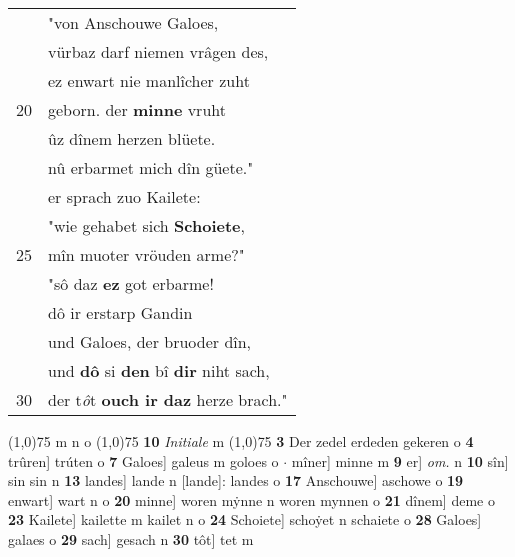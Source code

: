 \documentclass[8pt,a4paper,notitlepage]{article}
\begin{document}
\begin{table}[ht]
\begin{minipage}[t]{0.5\linewidth}
\begin{tabular}{rl}
 & "von Anschouwe Galoes,\\ 
 & vürbaz darf niemen vrâgen des,\\ 
 & ez enwart nie manlîcher zuht\\ 
20 & geborn. der \textbf{minne} vruht\\ 
 & ûz dînem herzen blüete.\\ 
 & nû erbarmet mich dîn güete."\\ 
 & er sprach zuo Kailete:\\ 
 & "wie gehabet sich \textbf{Schoiete},\\ 
25 & mîn muoter vröuden arme?"\\ 
 & "sô daz \textbf{ez} got erbarme!\\ 
 & dô ir erstarp Gandin\\ 
 & und Galoes, der bruoder dîn,\\ 
 & und \textbf{dô} si \textbf{den} bî \textbf{dir} niht sach,\\ 
30 & der t\textit{ô}t \textbf{ouch ir daz} herze brach."\\ 
\end{tabular}
\scriptsize
\line(1,0){75} \newline
m n o \newline
\line(1,0){75} \newline
\textbf{10} \textit{Initiale} m  \newline
\line(1,0){75} \newline
\textbf{3} Der zedel erdeden gekeren o \textbf{4} trûren] trúten o \textbf{7} Galoes] galeus m goloes o  $\cdot$ mîner] minne m \textbf{9} er] \textit{om.} n \textbf{10} sîn] sin sin n \textbf{13} landes] lande n [lande]: landes o \textbf{17} Anschouwe] aschowe o \textbf{19} enwart] wart n o \textbf{20} minne] woren mẏnne n woren mynnen o \textbf{21} dînem] deme o \textbf{23} Kailete] kailette m kailet n o \textbf{24} Schoiete] schoẏet n schaiete o \textbf{28} Galoes] galaes o \textbf{29} sach] gesach n \textbf{30} tôt] tet m \newline
\end{minipage}
\end{table}
\newpage
\end{document}
